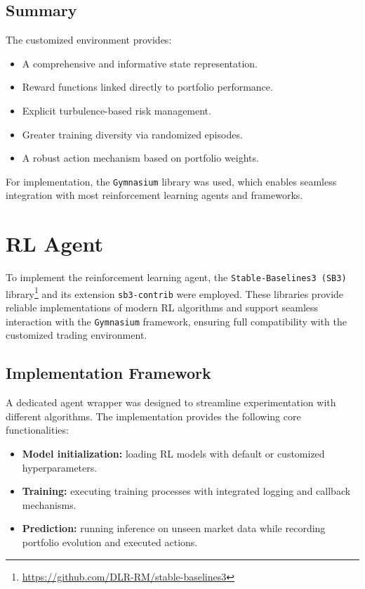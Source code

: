 \documentclass[12pt,a4paper]{report}
\begin{document}
\subsection{Summary}
The customized environment provides:
\begin{itemize}
    \item A comprehensive and informative state representation.
    \item Reward functions linked directly to portfolio performance.
    \item Explicit turbulence-based risk management.
    \item Greater training diversity via randomized episodes.
    \item A robust action mechanism based on portfolio weights.
\end{itemize}

For implementation, the \texttt{Gymnasium} library was used, which enables seamless integration with most reinforcement learning agents and frameworks.  


\section{RL Agent}
\label{sec:rl_agent}

To implement the reinforcement learning agent, the \texttt{Stable-Baselines3 (SB3)} library\footnote{\url{https://github.com/DLR-RM/stable-baselines3}} and its extension \texttt{sb3-contrib} were employed. These libraries provide reliable implementations of modern RL algorithms and support seamless interaction with the \texttt{Gymnasium} framework, ensuring full compatibility with the customized trading environment.

\subsection{Implementation Framework}
A dedicated agent wrapper was designed to streamline experimentation with different algorithms. The implementation provides the following core functionalities:
\begin{itemize}
    \item \textbf{Model initialization:} loading RL models with default or customized hyperparameters.
    \item \textbf{Training:} executing training processes with integrated logging and callback mechanisms.
    \item \textbf{Prediction:} running inference on unseen market data while recording portfolio evolution and executed actions.
\end{itemize}
\end{document}
